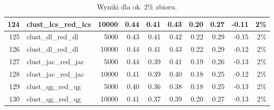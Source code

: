 \documentclass{praca1}
\begin{document}
\begin{table}[!h]
\begin{tabular}{|rlr|rrr|rr|r|r|}
  124 & clust\_lcs\_red\_lcs & 10000 & 0.44 & 0.41 & 0.43 & 0.20 & 0.27 & -0.11 & 2\% \\ 
   \hline
125 & clust\_dl\_red\_dl & 5000 & 0.43 & 0.41 & 0.42 & 0.22 & 0.29 & -0.15 & 2\% \\ 
  126 & clust\_dl\_red\_dl & 10000 & 0.44 & 0.41 & 0.43 & 0.22 & 0.29 & -0.12 & 2\% \\ 
   \hline
127 & clust\_jac\_red\_jac & 5000 & 0.44 & 0.39 & 0.41 & 0.19 & 0.26 & -0.13 & 2\% \\ 
  128 & clust\_jac\_red\_jac & 10000 & 0.41 & 0.39 & 0.40 & 0.18 & 0.25 & -0.12 & 2\% \\ 
   \hline
129 & clust\_qg\_red\_qg & 5000 & 0.40 & 0.36 & 0.38 & 0.18 & 0.25 & -0.13 & 2\% \\ 
  130 & clust\_qg\_red\_qg & 10000 & 0.41 & 0.37 & 0.39 & 0.20 & 0.27 & -0.13 & 2\% \\ 
   \hline
\end{tabular}
\caption{Wyniki dla ok. $2\%$ zbioru.}
\label{tab:008}
\end{table}






\end{document}
